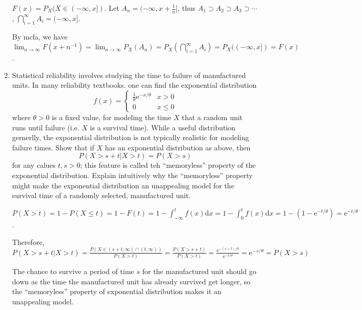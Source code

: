 \documentclass[letter]{article}
\begin{document}
\begin{enumerate}[leftmargin = 0 em, label = \arabic*., font = \bfseries]
	$F(x) = P_{X} (X \in (-\infty, x])$. Let $A_n = (-\infty, x + \frac{1}{n}]$, thus $A_1 \supset A_2 \supset A_3 \supset \cdots$, $\bigcap_{i=1}^{\infty} A_i = (-\infty, x]$.

	By mcfa, we have $\lim_{n\to \infty}F(x+n^{-1}) = \lim_{n\to\infty} P_{X}(A_n) = P_{X}(\bigcap_{i=1}^{\infty}A_i) = P_X ((-\infty, x]) = F(x)$.

	\item Statistical reliability involves studying the time to failure of manufactured units. In many reliability textbooks. one can find the exponential distribution
	\[f(x) = \begin{cases}
	\frac{1}{\theta} \mathrm{e}^{- x/\theta}&x>0\\
	0&x\leq 0
	\end{cases}\]
	where $\theta>0$ is a fixed value, for modeling the time $X$ that a random unit runs until failure (i.e. $X$ is a survival time). While a useful distribution gernerlly, the exponential distribution is not typically realistic for modeling failure times. Show that if $X$ has an exponential distribution as above, then 
	\[P(X > s+t|X>t) = P(X>s)\]
	for any calues $t,s >0$; this feature is called teh ``memoryless'' property of the exponential distribution. Explain intuitively why the ``memoryless'' property might make the exponential distribution an unappealing model for the survival time of a randomly selected, manufactured unit.

	$P(X > t ) = 1 - P(X\leq t) = 1 - F(t) = 1 - \int_{-\infty}^{t}f(x) \mathrm{d}x = 1 - \int_{0}^t f(x) \mathrm{d}x = 1 - (1 - \mathrm{e}^{-t/\theta}) = \mathrm{e}^{-t/\theta} $.

	Therefore, $P(X> s+t | X>t) = \frac{P(X\in (s+t, \infty)\cap (t, \infty))}{P(X>t)} = \frac{P(X>s+t)}{P(X>t)} = \frac{\mathrm{e}^{-(s+t)/\theta}}{\mathrm{e}^{-t/\theta}} = \mathrm{e}^{-s/\theta} = P(X>s)$

	The chance to survive a period of time $s$ for the manufactured unit should go down as the time the manufactured unit has already survived get longer, so the ``memoryless'' property of exponential distribution makes it an unappealing model.
 	\end{enumerate}


	
	
	
	
\end{document}
